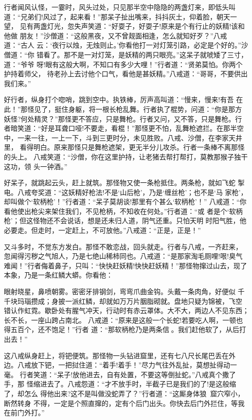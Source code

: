 行者闻风认怪，一霎时，风头过处，只见那半空中隐隐的两盏灯来，即低头叫
道：“兄弟们!风过了，起来看！”那呆子扯出嘴来，抖抖灰土，仰着脸，朝天一望，
见有两盏灯光，忽失声笑道：“好耍子，好耍子!原来是个有行止的妖精!该和他做
朋友！”沙僧道：“这般黑夜，又不曾觌面相逢，怎么就知好歹？”八戒道：“古人
云：‘夜行以烛，无烛则止。’你看他打一对灯笼引路，必定是个好的。”沙僧道：“你
错看了。那不是一对灯笼，是妖精的两只眼亮。”这呆子就唬矮了三寸，道：“爷爷
呀!眼有这般大啊，不知口有多少大哩！”行者道：“贤弟莫怕。你两个护持着师父，
待老孙上去讨他个口气，看他是甚妖精。”八戒道：“哥哥，不要供出我们来。”

好行者，纵身打个唿哨，跳到空中。执铁棒，厉声高叫道：“慢来，慢来!有吾
在此！”那怪见了，挺住身躯，将一根长枪乱舞。行者执了棍势，问道：“你是那方
妖怪?何处精灵？”那怪更不答应，只是舞枪。行者又问，又不答，只是舞枪。行
者暗笑道：“好是耳聋口哑!不要走，看棍！”那怪更不怕，乱舞枪遮拦。在那半空
中，一来一往，一上一下，斗到三更时分，未见胜败。八戒、沙僧，在李家天井里，
看得明白。原来那怪只是舞枪遮架，更无半分儿攻杀。行者一条棒不离那怪的头上。
八戒笑道：“沙僧，你在这里护持，让老猪去帮打帮打，莫教那猴子独干这功，领
头一钟酒。”

好呆子，就跳起云头，赶上就筑。那怪物又使一条枪抵住。两条枪，就如飞蛇
掣电。八戒夸奖道：“这妖精好枪法!不是‘山后枪’，乃是‘缠丝枪’；也不是‘马
家枪’，却叫做个‘软柄枪’！”行者道：“呆子莫胡谈!那里有个甚么‘软柄枪’！”
八戒道：“你看他使出枪尖来架住我们，不见枪柄，不知收在何处。”行者道：“或
者是个‘软柄枪’；但这怪物还不会说话，想是还未归人道，阴气还重。只怕天明
时阳气胜，他必要走。但走时，一定赶上，不可放他。”八戒道：“正是，正是！”

又斗多时，不觉东方发白。那怪不敢恋战，回头就走。行者与八戒，一齐赶来，
忽闻得污秽之气旭人，乃是七绝山稀柿同也。八戒道：“是那家淘毛厕哩!哏!臭气
难闻！”行者侮着鼻子，只叫：“快快赶妖精!快快赶妖精！”那怪物撺过山去，现了
本象，乃是一条红鳞大蟒。你看他：

眼射晓星，鼻喷朝雾。密密牙排钢剑，弯弯爪曲金钩。头戴一条肉角，好便似
千千块玛瑙攒成；身披一派红鳞，却就如万万片胭脂砌就。盘地只疑为锦被，飞空
错认作虹霓。歇卧处有腥气冲天，行动时有赤云罩体。大不大，两边人不见东西；
长不长，一座山跨占南北。
八戒道：“原来是这般一个长蛇!若要吃人啊，一顿也得五百个，还不饱足！”行者
道：“那软柄枪乃是两条信。我们赶他软了，从后打出去！”

这八戒纵身赶上，将钯便筑。那怪物一头钻进窟里，还有七八尺长尾巴丢在外
边。八戒放下钯，一把挝住道：“着手!着手！”尽力气往外乱扯，莫想扯得动一毫。
行者笑道：“呆子!放他进去，自有处置，不要这等倒扯蛇。”八戒真个撒了手，那
怪缩进去了。八戒怨道：“才不放手时，半截子已是我们的了!是这般缩了，却怎么
得他出来?这不是叫做没蛇弄了？”行者道：“这厮身体狼，窟穴窄小，断然转身
不得，一定是个照直撺的，定有个后门出头。你快去后门外拦住，等我在前门外打。”

